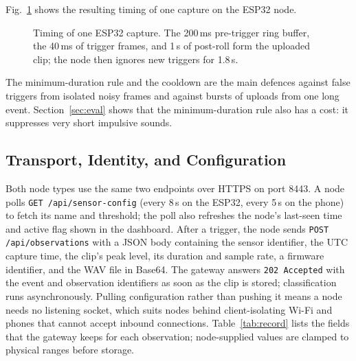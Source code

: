 \documentclass[conference]{IEEEtran}
\begin{document}
Fig.~\ref{fig:timeline} shows the resulting timing of one capture on the ESP32 node.

\begin{figure}[!t]
\centering
{}
\caption{Timing of one ESP32 capture. The 200\,ms pre-trigger ring buffer, the 40\,ms of trigger frames, and 1\,s of post-roll form the uploaded clip; the node then ignores new triggers for 1.8\,s.}
\label{fig:timeline}
\end{figure}

The minimum-duration rule and the cooldown are the main defences against false triggers from isolated noisy frames and against bursts of uploads from one long event. Section~\ref{sec:eval} shows that the minimum-duration rule also has a cost: it suppresses very short impulsive sounds.

\subsection{Transport, Identity, and Configuration}
Both node types use the same two endpoints over HTTPS on port 8443. A node polls \texttt{GET /api/sensor-config} (every 8\,s on the ESP32, every 5\,s on the phone) to fetch its name and threshold; the poll also refreshes the node's last-seen time and active flag shown in the dashboard. After a trigger, the node sends \texttt{POST /api/observations} with a JSON body containing the sensor identifier, the UTC capture time, the clip's peak level, its duration and sample rate, a firmware identifier, and the WAV file in Base64. The gateway answers \texttt{202 Accepted} with the event and observation identifiers as soon as the clip is stored; classification runs asynchronously. Pulling configuration rather than pushing it means a node needs no listening socket, which suits nodes behind client-isolating Wi-Fi and phones that cannot accept inbound connections. Table~\ref{tab:record} lists the fields that the gateway keeps for each observation; node-supplied values are clamped to physical ranges before storage.
\end{document}
